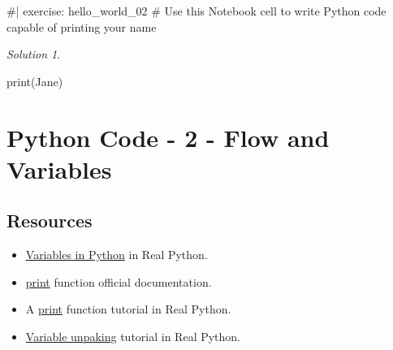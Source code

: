 \documentclass[
  letterpaper,
  DIV=11,
  numbers=noendperiod]{scrreprt}
\newenvironment{Shaded}{\begin{snugshade}}{\end{snugshade}}
\newcommand{\BuiltInTok}[1]{\textcolor[rgb]{0.00,0.23,0.31}{#1}}
\newcommand{\NormalTok}[1]{\textcolor[rgb]{0.00,0.23,0.31}{#1}}
\newcommand{\StringTok}[1]{\textcolor[rgb]{0.13,0.47,0.30}{#1}}
\providecommand{\tightlist}{%
  \setlength{\itemsep}{0pt}\setlength{\parskip}{0pt}}\usepackage{longtable,booktabs,array}
\theoremstyle{remark}
\newtheorem*{solution}{Solution}
\begin{document}
\begin{Shaded}
\begin{Highlighting}[]
\NormalTok{\#| exercise: hello\_world\_02}
\NormalTok{\# Use this Notebook cell to write Python code capable of printing your name}
\end{Highlighting}
\end{Shaded}

\begin{solution}
\leavevmode

\begin{tcolorbox}[enhanced jigsaw, opacityback=0, colframe=quarto-callout-tip-color-frame, breakable, colback=white, colbacktitle=quarto-callout-tip-color!10!white, titlerule=0mm, left=2mm, toprule=.15mm, coltitle=black, opacitybacktitle=0.6, bottomrule=.15mm, arc=.35mm, leftrule=.75mm, bottomtitle=1mm, toptitle=1mm, rightrule=.15mm, title=\textcolor{quarto-callout-tip-color}{\faLightbulb}\hspace{0.5em}{Tip}]

\begin{Shaded}
\begin{Highlighting}[]
\BuiltInTok{print}\NormalTok{(}\StringTok{\textquotesingle{}Jane\textquotesingle{}}\NormalTok{)}
\end{Highlighting}
\end{Shaded}

\end{tcolorbox}

\end{solution}


\chapter{Python Code - 2 - Flow and
Variables}\label{python-code---2---flow-and-variables}

\section{Resources}\label{resources}

\begin{itemize}
\tightlist
\item
  \href{https://realpython.com/python-variables/}{Variables in Python}
  in Real Python.
\item
  \href{https://docs.python.org/3/library/functions.html\#print}{print}
  function official documentation.
\item
  A \href{https://realpython.com/python-print/}{print} function tutorial
  in Real Python.
\item
  \href{https://realpython.com/lessons/tuple-assignment-packing-unpacking/}{Variable
  unpaking} tutorial in Real Python.
\end{itemize}
\end{document}
